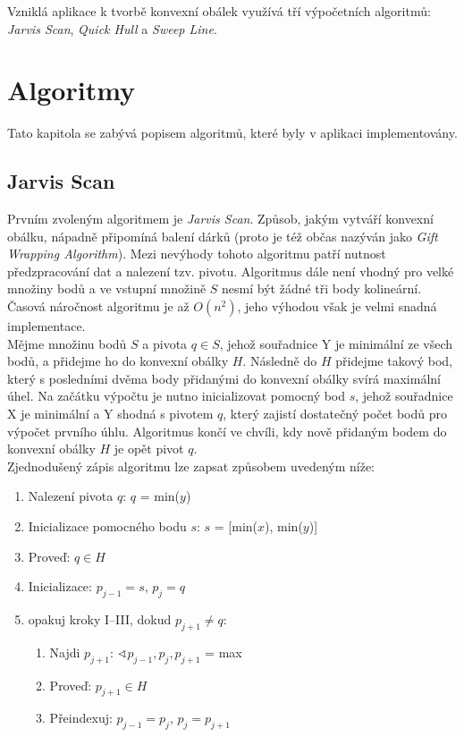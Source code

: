 \documentclass[a4paper, 12pt]{article}
\begin{document}

Vzniklá aplikace k tvorbě konvexní obálek využívá tří výpočetních algoritmů: \textit{Jarvis Scan}, \textit{Quick Hull} a \textit{Sweep Line}.

\section{Algoritmy}
Tato kapitola se zabývá popisem algoritmů, které byly v aplikaci implementovány. 

\subsection{Jarvis Scan}
Prvním zvoleným algoritmem je \textit{Jarvis Scan}. Způsob, jakým vytváří konvexní obálku, nápadně připomíná balení dárků (proto je též občas nazýván jako \textit{Gift Wrapping Algorithm}). Mezi nevýhody tohoto algoritmu patří nutnost předzpracování dat a nalezení tzv. pivotu. Algoritmus dále není vhodný pro velké množiny bodů a ve vstupní množině $S$ nesmí být žádné tři body kolineární. Časová náročnost algoritmu je až $O(n^2)$, jeho výhodou však je velmi snadná implementace.\\

Mějme množinu bodů $S$ a pivota $q \in S$, jehož souřadnice Y je minimální ze všech bodů, a přidejme ho do konvexní obálky $H$. Následně do $H$ přidejme takový bod, který s posledními dvěma body přidanými do konvexní obálky svírá maximální úhel. Na začátku výpočtu je nutno inicializovat pomocný bod $s$, jehož souřadnice X je minimální a Y shodná s pivotem $q$, který zajistí dostatečný počet bodů pro výpočet prvního úhlu. Algoritmus končí ve chvíli, kdy nově přidaným bodem do konvexní obálky $H$ je opět pivot $q$. \\

Zjednodušený zápis algoritmu lze zapsat způsobem uvedeným níže:

\begin{enumerate}
\item Nalezení pivota $q$: $q$ = min($y$) 
\item Inicializace pomocného bodu $s$: $s$ = [min($x$), min($y$)]
\item Proveď: $q \in H$
\item Inicializace: $p_{j-1} = s$, $p_j = q$
\item opakuj kroky I–III, dokud $p_{j+1} \neq q$:
\begin{enumerate}[label=\Roman*.]
\item 	Najdi $p_{j+1}$: $\sphericalangle p_{j-1}, p_j, p_{j+1}$ = max
\item 	Proveď: $p_{j+1} \in H$
\item 	Přeindexuj: $p_{j-1} = p_j$, $p_j = p_{j+1}$
\end{enumerate}
\end{enumerate}
\end{document}
